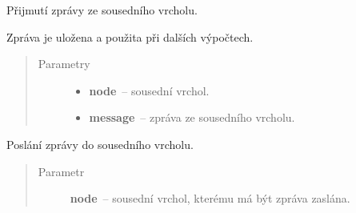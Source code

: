 \begin{fulllineitems}
\begin{fulllineitems}
\end{fulllineitems}


\begin{fulllineitems}
\label{alex.infer:alex.infer.factor.alex.infer.node.DirichletParameterNode.message_from}
Přijmutí zprávy ze sousedního vrcholu.

Zpráva je uložena a použita při dalších výpočtech.
\begin{quote}\begin{description}
\item[{Parametry}] \leavevmode\begin{itemize}
\item {} 
\textbf{node}~-- sousední vrchol.

\item {} 
\textbf{message}~-- zpráva ze sousedního vrcholu.

\end{itemize}

\end{description}\end{quote}

\end{fulllineitems}


\begin{fulllineitems}
\label{alex.infer:alex.infer.factor.alex.infer.node.DirichletParameterNode.message_to}
Poslání zprávy do sousedního vrcholu.
\begin{quote}\begin{description}
\item[{Parametr}] \leavevmode
\textbf{node}~-- sousední vrchol, kterému má být zpráva zaslána.

\end{description}\end{quote}

\end{fulllineitems}


\end{fulllineitems}

